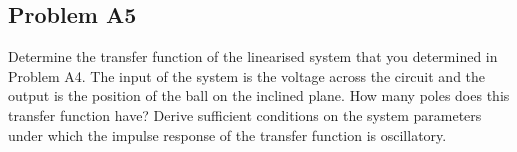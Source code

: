 \subsection*{Problem A5}Determine the transfer function of the linearised system that you determined in Problem A4. The input of the system is the voltage across the circuit and the output is the position of the ball on the inclined plane. How many poles does this transfer function have? Derive sufficient conditions on the system parameters under which the impulse response of the transfer function is oscillatory.
